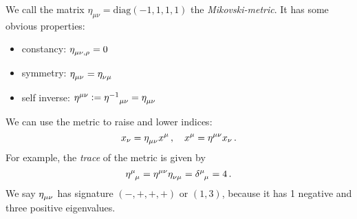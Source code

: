 We call the matrix $\eta_{\mu\nu}=\mathrm{diag}(-1,1,1,1)$ the
\emph{Mikovski-metric}. It has some obvious properties:
\begin{itemize}
  \item constancy: $\tensor{\eta}{_\mu_\nu_,_\rho}=0$
  \item symmetry: $\tensor{\eta}{_\mu_\nu}=\tensor{\eta}{_\nu_\mu}$
  \item self inverse:
  $\tensor{\eta}{^\mu^\nu}:=\tensor{{\eta^{-1}}}{_\mu_\nu}=\tensor{\eta}{_\mu_\nu}$
\end{itemize}
We can use the metric to raise and lower indices:
\begin{equation}
x_\nu=\tensor{\eta}{_\mu_\nu}x^\mu\, ,\quad x^\mu=\tensor{\eta}{^\mu^\nu}x_\nu\,
.
\end{equation}
For example, the \emph{trace} of the metric is given by
\begin{equation}
\tensor{\eta}{^\mu_\mu}=\tensor{\eta}{^\mu^\nu}\tensor{\eta}{_\nu_\mu}
=\tensor{\delta}{^\mu_\mu}=4\, .
\end{equation}
We say $\tensor{\eta}{_\mu_\nu}$ has signature $(-,+,+,+)$ or $(1,3)$, because
it has 1 negative and three positive eigenvalues.
